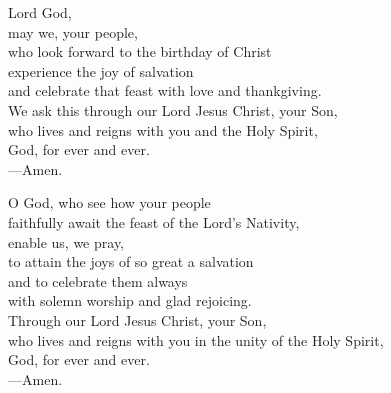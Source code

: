 \prayer


\begin{prayerverse}
Lord God,\\
may we, your people,\\
who look forward to the birthday of Christ\\
experience the joy of salvation\\
and celebrate that feast with love and thankgiving.\\
We ask this through our Lord Jesus Christ, your Son,\\
who lives and reigns with you and the Holy Spirit,\\
God, for ever and ever.\\
{\color{red}---\thinspace}Amen.
\end{prayerverse}


\begin{prayerverse}
O God, who see how your people\\
faithfully await the feast of the Lord’s Nativity,\\
enable us, we pray,\\
to attain the joys of so great a salvation\\
and to celebrate them always\\
with solemn worship and glad rejoicing.\\
Through our Lord Jesus Christ, your Son,\\
who lives and reigns with you in the unity of the Holy Spirit,\\
God, for ever and ever.\\
{\color{red}---\thinspace}Amen.
\end{prayerverse}

